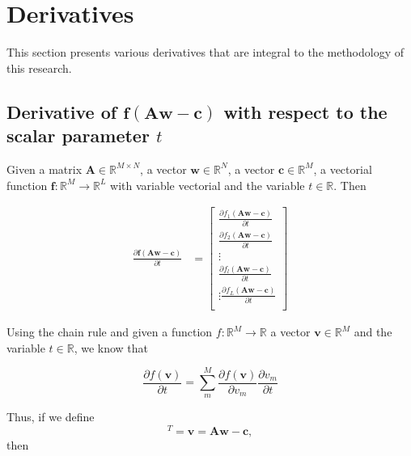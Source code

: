 \section{Derivatives}

This section presents various derivatives that are integral to the methodology of this research.

\subsection{Derivative of $\mathbf{f}\left(\mathbf{A}\mathbf{w}-\mathbf{c}\right)$ with respect to the scalar parameter $t$}

Given 
a matrix $\mathbf{A} \in \mathbb{R}^{M\times N}$,
a vector $\mathbf{w} \in \mathbb{R}^{N}$,
a vector $\mathbf{c} \in \mathbb{R}^{M}$,
a vectorial function $\mathbf{f}:\mathbb{R}^{M} \to \mathbb{R}^{L}$ with variable vectorial
and 
the variable $t \in \mathbb{R}$. 
Then

\begin{align}
\label{eq:fAwc}
\frac{\partial \mathbf{f}\left(\mathbf{A}\mathbf{w}-\mathbf{c}\right)}{\partial t}
&=
\begin{bmatrix}
\frac{\partial f_{1}\left(\mathbf{A}\mathbf{w}-\mathbf{c}\right)}{\partial t}\\[4pt]
\frac{\partial f_{2}\left(\mathbf{A}\mathbf{w}-\mathbf{c}\right)}{\partial t}\\[4pt]
\vdots\\[4pt]
\frac{\partial f_{l}\left(\mathbf{A}\mathbf{w}-\mathbf{c}\right)}{\partial t}\\[4pt]
\vdots
\frac{\partial f_{L}\left(\mathbf{A}\mathbf{w}-\mathbf{c}\right)}{\partial t}\\[4pt]
\end{bmatrix}
\end{align}

Using the chain rule \cite[pp. 15]{petersen2008matrix} and 
given 
a function $f:\mathbb{R}^{M} \to \mathbb{R}$ 
a vector $\mathbf{v} \in \mathbb{R}^{M}$ 
and 
the variable $t \in \mathbb{R}$,
we know that

\begin{equation}
\frac{\partial f\left(\mathbf{v}\right)}{\partial t} = 
\sum_{m}^{M}
\frac{\partial f\left(\mathbf{v}\right)}{\partial v_m}
\frac{\partial v_m}{\partial t}
\end{equation}

Thus, if we define 
\begin{equation}
[\dots,~v_{m},~\dots]^{T}=\mathbf{v}=\mathbf{A}\mathbf{w}-\mathbf{c},
\end{equation}
then

